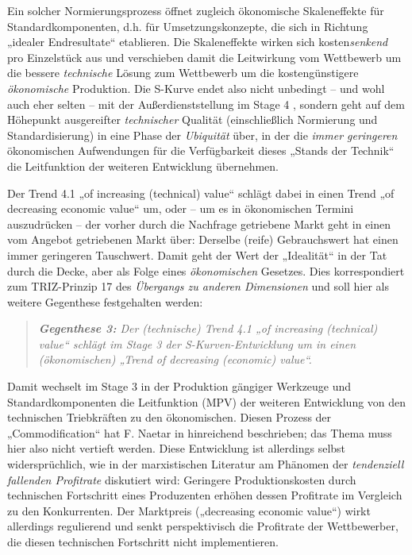 \documentclass[11pt,a4paper]{article}
\begin{document}
Ein solcher Normierungsprozess öffnet zugleich ökonomische Skaleneffekte für
Standardkomponenten, d.h. für Umsetzungskonzepte, die sich in Richtung
„idealer Endresultate“ etablieren. Die Skaleneffekte wirken sich
kosten\emph{senkend} pro Einzelstück aus und verschieben damit die Leitwirkung
vom Wettbewerb um die bessere \emph{technische} Lösung zum Wettbewerb um die
kostengünstigere \emph{ökonomische} Produktion.  Die S-Kurve endet also nicht
unbedingt -- und wohl auch eher selten -- mit der Außerdienststellung im Stage
4 \cite[S. 38]{TESE2018}, sondern geht auf dem Höhepunkt ausgereifter
\emph{technischer} Qualität (einschließlich Normierung und Standardisierung)
in eine Phase der \emph{Ubiquität} über, in der die \emph{immer geringeren}
ökonomischen Aufwendungen für die Verfügbarkeit dieses „Stands der Technik“
die Leitfunktion der weiteren Entwicklung übernehmen.

Der Trend 4.1 „of increasing (technical) value“ schlägt dabei in einen Trend
„of decreasing economic value“ um, oder -- um es in ökonomischen Termini
auszudrücken -- der vorher durch die Nachfrage getriebene Markt geht in einen
vom Angebot getriebenen Markt über: Derselbe (reife) Gebrauchswert hat einen
immer geringeren Tauschwert.  Damit geht der Wert der „Idealität“
\cite[Kap. 4.1.1]{KS2017} in der Tat durch die Decke, aber als Folge eines
\emph{ökonomischen} Gesetzes.  Dies korrespondiert zum TRIZ-Prinzip 17 des
\emph{Übergangs zu anderen Dimensionen} und soll hier als weitere Gegenthese
festgehalten werden:
\begin{quote}\it
  \textbf{Gegenthese 3:} Der (technische) Trend 4.1 „of increasing (technical)
  value“ schlägt im Stage 3 der S-Kurven-Entwicklung um in einen
  (ökonomischen) „Trend of decreasing (economic) value“.
\end{quote}
Damit wechselt im Stage 3 in der Produktion gängiger Werkzeuge und
Standardkomponenten die Leitfunktion (MPV) der weiteren Entwicklung von den
technischen Triebkräften zu den ökonomischen. Diesen Prozess der
„Commodification“ hat F. Naetar in \cite{Naetar2005} hinreichend beschrieben;
das Thema muss hier also nicht vertieft werden. Diese Entwicklung ist
allerdings selbst widersprüchlich, wie in der marxistischen Literatur am
Phänomen der \emph{tendenziell fallenden Profitrate} diskutiert wird:
Geringere Produktionskosten durch technischen Fortschritt eines Produzenten
erhöhen dessen Profitrate im Vergleich zu den Konkurrenten. Der Marktpreis
(„decreasing economic value“) wirkt allerdings regulierend und senkt
perspektivisch die Profitrate der Wettbewerber, die diesen technischen
Fortschritt nicht implementieren.
\end{document}
